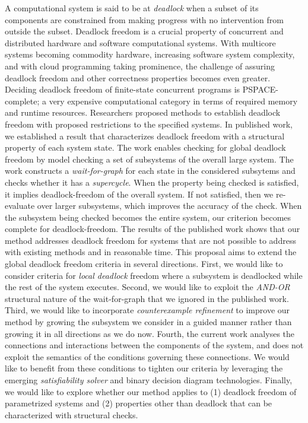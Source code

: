 A computational system is said to be at {\em deadlock} 
when a subset of its components are constrained 
from making progress with no intervention from outside 
the subset. 
%
Deadlock freedom is a crucial property of concurrent and 
distributed hardware and software computational systems. 
%
With multicore systems becoming commodity hardware, 
increasing software system complexity, 
and with cloud programming taking prominence, 
the challenge of assuring deadlock freedom and other 
correctness properties becomes even greater.  
%
Deciding deadlock freedom of finite-state concurrent 
programs is PSPACE-complete; a very expensive computational 
category in terms of required memory and runtime resources. 
%
Researchers proposed methods to establish deadlock freedom
with proposed restrictions to the specified systems. 
%
In published work, 
we established a result that characterizes deadlock freedom
with a structural property of each system state. 
The work enables checking for global deadlock freedom
by model checking a set of subsystems 
of the overall large system. 
The work constructs a {\em wait-for-graph} for each state
in the considered subsytems
and checks whether it has a {\em supercycle}. 
%
When the property being checked is satisfied, 
it implies deadlock-freedom of the overall system. 
If not satisfied, then we re-evaluate over larger subsystems,
which improves the accuracy of the check.  
When the subsystem being checked becomes the entire system, 
our criterion becomes complete for
deadlock-freedom.  
%
The results of the published work shows that our method
addresses deadlock freedom for systems that are not possible 
to address with existing methods and in reasonable time. 
%
This proposal aims to extend the global deadlock freedom 
criteria in several directions. 
First, we would like to consider criteria for {\em local deadlock}
freedom where
a subsystem is deadlocked while the rest of the system executes. 
%
Second, 
we would like to exploit the {\em AND-OR} structural nature of the 
wait-for-graph that we ignored in the published work. 
%
Third, 
we would like to incorporate {\em counterexample refinement}
to improve our method by growing the subsystem we consider in a
guided manner rather than growing it in all directions as we do now. 
%
Fourth, 
the current work analyses the connections and interactions
between the components of the system, and does not exploit the 
semantics of the conditions governing these connections. 
We would like to benefit from these conditions to tighten 
our criteria by leveraging the emerging {\em satisfiability 
solver} and binary decision diagram technologies.
%
%
Finally, 
we would like to explore whether our method applies to 
(1) deadlock freedom of parametrized systems and 
(2) properties other than deadlock that can be characterized 
with structural checks. 

